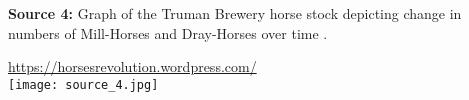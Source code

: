 \textbf{Source 4:} Graph of the Truman Brewery horse stock depicting change in numbers of Mill-Horses and Dray-Horses over time \cite{trum59}.

\url{https://horsesrevolution.wordpress.com/} \\

\texttt{[image: source\_4.jpg]} \\